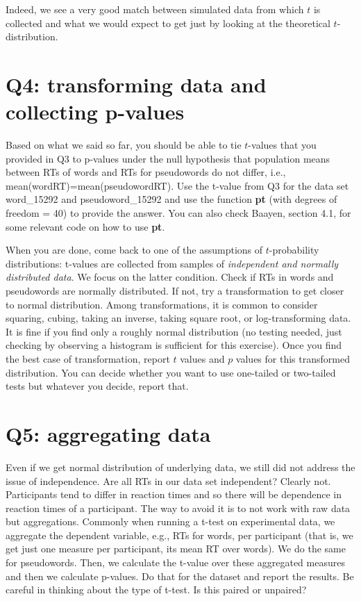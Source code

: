\documentclass{article}\usepackage[]{graphicx}\usepackage[]{color}
\begin{document}
Indeed, we see a very good match between simulated data from which $t$ is collected and what we would expect to get just by looking at the theoretical $t$-distribution.

\section*{Q4: transforming data and collecting p-values}

Based on what we said so far, you should be able to tie $t$-values that you provided in Q3 to p-values under the null hypothesis that population means between RTs of words and RTs for pseudowords do not differ, i.e., mean(wordRT)=mean(pseudowordRT). Use the t-value from Q3 for the data set word\_15292 and pseudoword\_15292 and use the function \textbf{pt} (with degrees of freedom = 40) to provide the answer. You can also check Baayen, section 4.1, for some relevant code on how to use \textbf{pt}.

When you are done, come back to one of the assumptions of $t$-probability distributions: t-values are collected from samples of \emph{independent and normally distributed data}. We focus on the latter condition. Check if RTs in words and pseudowords are normally distributed. If not, try a transformation to get closer to normal distribution. Among transformations, it is common to consider squaring, cubing, taking an inverse, taking square root, or log-transforming data. It is fine if you find only a roughly normal distribution (no testing needed, just checking by observing a histogram is sufficient for this exercise). Once you find the best case of transformation, report $t$ values and $p$ values for this transformed distribution. You can decide whether you want to use one-tailed or two-tailed tests but whatever you decide, report that.

\section*{Q5: aggregating data}

Even if we get normal distribution of underlying data, we still did not address the issue of independence. Are all RTs in our data set independent? Clearly not. Participants tend to differ in reaction times and so there will be dependence in reaction times of a participant. The way to avoid it is to not work with raw data but aggregations. Commonly when running a t-test on experimental data, we aggregate the dependent variable, e.g., RTs for words, per participant (that is, we get just one measure per participant, its mean RT over words). We do the same for pseudowords. Then, we calculate the t-value over these aggregated measures and then we calculate p-values. Do that for the dataset and report the results. Be careful in thinking about the type of t-test. Is this paired or unpaired?
\end{document}
